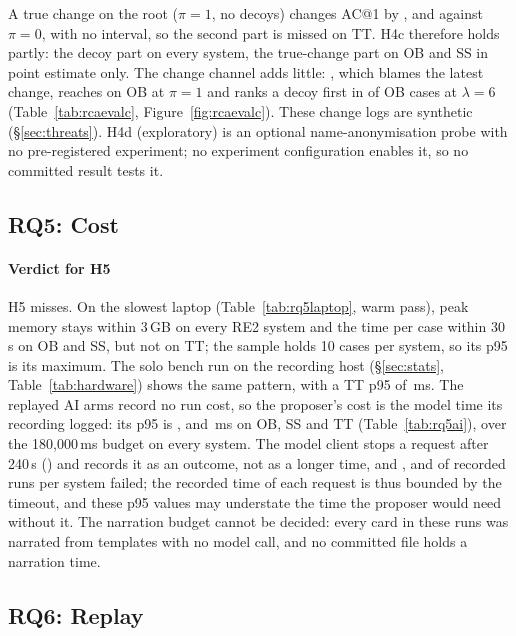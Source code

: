 A true change on the root ($\pi = 1$, no decoys) changes AC@1 by ,  and  against $\pi = 0$, with no interval, so the second part is missed on TT.
H4c therefore holds partly: the decoy part on every system, the true-change part on OB and SS in point estimate only.
The change channel adds little: , which blames the latest change, reaches  on OB at $\pi = 1$ and ranks a decoy first in  of OB cases at $\lambda = 6$ (Table~\ref{tab:rcaevalc}, Figure~\ref{fig:rcaevalc}).
These change logs are synthetic (\S\ref{sec:threats}).
H4d (exploratory) is an optional name-anonymisation probe with no pre-registered experiment; no experiment configuration enables it, so no committed result tests it.

\subsection{RQ5: Cost}
\label{sec:rq5}


\paragraph{Verdict for H5}
H5 misses.
On the slowest laptop (Table~\ref{tab:rq5laptop}, warm pass), peak memory stays within 3\,GB on every RE2 system and the time per case within 30\,s on OB and SS, but not on TT; the sample holds 10 cases per system, so its p95 is its maximum.
The solo bench run on the recording host (\S\ref{sec:stats}, Table~\ref{tab:hardware}) shows the same pattern, with a TT p95 of \,ms.
The replayed AI arms record no run cost, so the proposer's cost is the model time its recording logged: its p95 is ,  and \,ms on OB, SS and TT (Table~\ref{tab:rq5ai}), over the 180{,}000\,ms budget on every system.
The model client stops a request after 240\,s () and records it as an outcome, not as a longer time, and ,  and  of  recorded runs per system failed; the recorded time of each request is thus bounded by the timeout, and these p95 values may understate the time the proposer would need without it.
The narration budget cannot be decided: every card in these runs was narrated from templates with no model call, and no committed file holds a narration time.

\subsection{RQ6: Replay}
\label{sec:rq6}

